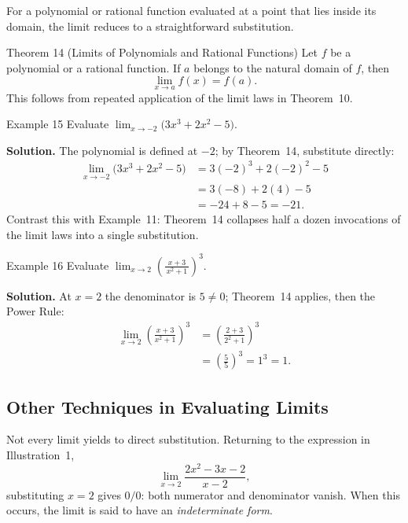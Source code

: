 \bigskip

For a polynomial or rational function evaluated at a point that lies inside its domain, the limit reduces to a straightforward substitution.

\begin{theorembox}{Theorem 14 (Limits of Polynomials and Rational Functions)}
Let \(f\) be a polynomial or a rational function.  If \(a\) belongs to the natural domain of \(f\), then
\[
\lim_{x \to a} f(x) = f(a).
\]
This follows from repeated application of the limit laws in Theorem~10.
\end{theorembox}

\begin{examplebox}{Example 15}
Evaluate \(\displaystyle\lim_{x \to -2} \bigl(3x^{3} + 2x^{2} - 5\bigr)\).

\medskip
\textbf{Solution.} The polynomial is defined at \(-2\); by Theorem~14, substitute directly:
\begin{align*}
\lim_{x \to -2} \bigl(3x^{3} + 2x^{2} - 5\bigr)
&= 3(-2)^{3} + 2(-2)^{2} - 5 \\
&= 3(-8) + 2(4) - 5 \\
&= -24 + 8 - 5 = -21.
\end{align*}
Contrast this with Example~11: Theorem~14 collapses half a dozen invocations of the limit laws into a single substitution.
\end{examplebox}

\begin{examplebox}{Example 16}
Evaluate \(\displaystyle\lim_{x \to 2} \left( \frac{x + 3}{\,x^{2} + 1\,} \right)^{\!3}\).

\medskip
\textbf{Solution.} At \(x = 2\) the denominator is \(5 \neq 0\); Theorem~14 applies, then the Power Rule:
\begin{align*}
\lim_{x \to 2} \left( \frac{x + 3}{x^{2} + 1} \right)^{\!3}
&= \left( \frac{2 + 3}{2^{2} + 1} \right)^{\!3}
   \tag{Thm.~14; then 4(e)} \\[8pt]
&= \left( \frac{5}{5} \right)^{\!3}
   = 1^{3}
   = 1.
\end{align*}
\end{examplebox}



\subsection*{Other Techniques in Evaluating Limits}
\label{subsec:1.1.3}


Not every limit yields to direct substitution.  Returning to the expression in Illustration~1,
\[
\lim_{x \to 2} \frac{2x^{2} - 3x - 2}{x - 2},
\]
substituting \(x = 2\) gives \(0/0\): both numerator and denominator vanish.  When this occurs, the limit is said to have an \emph{indeterminate form}.

